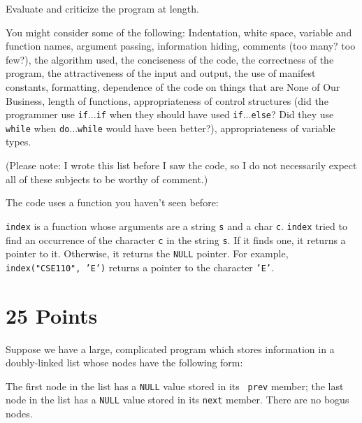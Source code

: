 Evaluate and criticize the program at length.

You might consider some of the following: Indentation, white space,
variable and function names, argument passing, information hiding,
comments (too many?  too few?), the algorithm used, the conciseness of
the code, the correctness of the program, the attractiveness of the
input and output, the use of manifest constants, formatting, dependence
of the code on things that are None of Our Business, length of
functions, appropriateness of control structures (did the programmer use
{\tt if}...{\tt if} when they should have used {\tt if}...{\tt else}?
Did they use {\tt while} when {\tt do}...{\tt while} would have been
better?), appropriateness of variable types.

(Please note: I wrote this list before I saw the code, so I do not
necessarily expect all of these subjects to be worthy of comment.)

The code uses a function you haven't seen before:

{\tt index} is a function whose arguments are a string {\tt s} and a
char {\tt c}.  {\tt index} tried to find an occurrence of the character
{\tt c} in the string {\tt s}.  If it finds one, it returns a pointer to
it.  Otherwise, it returns the {\tt NULL} pointer.  For example, {\tt
index("CSE110", 'E')} returns a pointer to the character {\tt 'E'}.  

\section{25 Points}

Suppose we have a large, complicated program which stores information in
a doubly-linked list whose nodes have the following form:

\begin{flushleft}
\verb% struct node {% \\*
\verb%   int province_code;% \\*
\verb%   int beheadment_count;% \\*
\verb%   int rioting_index;% \\*
\verb%   struct node *next; /* Pointer to next node in list */% \\*
\verb%   struct node *prev; /* Pointer to previous node in list */% \\*
\verb% } ;% 
\end{flushleft}
\label{struct}

The first node in the list has a {\tt NULL} value stored in its {\tt
prev} member; the last node in the list has a {\tt NULL} value stored in
its {\tt next} member.  There are no bogus nodes.

